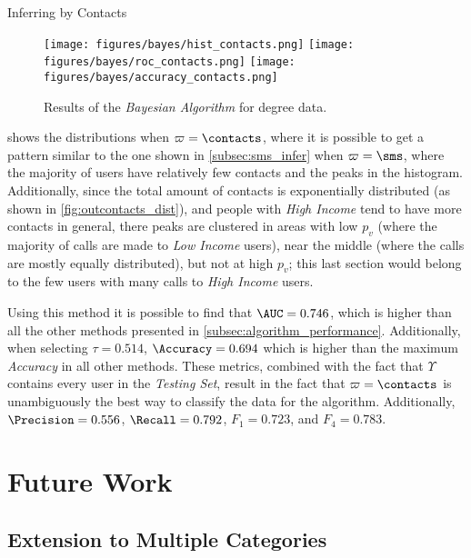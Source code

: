 \documentclass{beamer}
\begin{document}
\begin{frame}{Inferring by Contacts}

	\begin{figure}[h]
		\centering
		\texttt{[image: figures/bayes/hist\_contacts.png]}
		\texttt{[image: figures/bayes/roc\_contacts.png]}
		\texttt{[image: figures/bayes/accuracy\_contacts.png]}
		\caption{Results of the \emph{Bayesian Algorithm} for degree data.}
	\end{figure}

	 shows the distributions when $\varpi = \contacts$, where it is possible to get a pattern similar to the one shown in \cref{subsec:sms_infer} when $\varpi = \sms$, where the majority of users have relatively few contacts and the peaks in the histogram. Additionally, since the total amount of contacts is exponentially distributed (as shown in \cref{fig:outcontacts_dist}), and people with \emph{High Income} tend to have more contacts in general, there peaks are clustered in areas with low $p_v$ (where the majority of calls are made to \emph{Low Income} users), near the middle (where the calls are mostly equally distributed), but not at high $p_v$; this last section would belong to the few users with many calls to \emph{High Income} users.

	Using this method it is possible to find that $\AUC = 0.746$, which is higher than all the other methods presented in \cref{subsec:algorithm_performance}. Additionally, when selecting $\tau = 0.514$, $\Accuracy = 0.694$ which is higher than the maximum \emph{Accuracy} in all other methods. These metrics, combined with the fact that $\Upsilon$ contains every user in the \emph{Testing Set}, result in the fact that $\varpi = \contacts$ is unambiguously the best way to classify the data for the algorithm. Additionally, $\Precision = 0.556$, $\Recall = 0.792$, $F_1 = 0.723$, and $F_4 = 0.783$.

\end{frame}

\section{Future Work}
\subsection{Extension to Multiple Categories}
\end{document}
